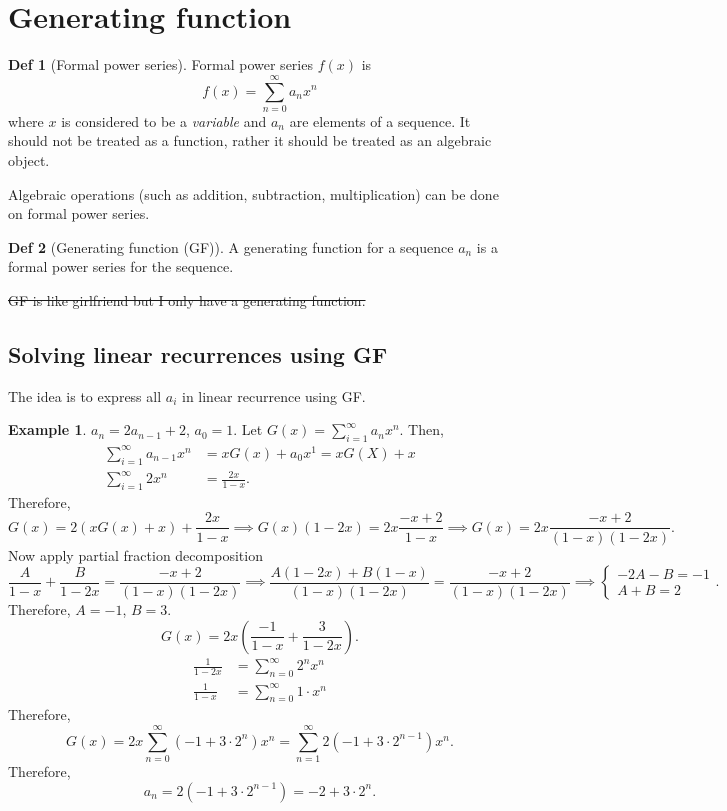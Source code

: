 \documentclass[a4paper]{article}
\theoremstyle{definition}
\newtheorem{definition}{Def}
\newtheorem{example}{Example}[section]
\begin{document}
\section{Generating function}

\begin{definition}[Formal power series]
  Formal power series \(f(x)\) is
  \[
    f(x) = \sum_{n = 0}^\infty a_n x^n
  \]
  where \(x\) is considered to be a \textit{variable}
  and \(a_n\) are elements of a sequence.
  It should not be treated as a function, rather
  it should be treated as an algebraic object.
\end{definition}
Algebraic operations (such as addition, subtraction, multiplication)
can be done on formal power series.
\begin{definition}[Generating function (GF)]
  A generating function for a sequence \(a_n\) is a
  formal power series for the sequence.
\end{definition}
\sout{GF is like girlfriend but I only have a generating function.}

\subsection{Solving linear recurrences using GF}

The idea is to express all \(a_i\) in linear recurrence using GF.
\begin{example}
  \(a_n = 2 a_{n - 1} + 2\),  \(a_0 = 1\).
  Let  \(G(x) = \sum_{i = 1}^\infty a_n x^n\).
  Then,
  \begin{align*}
    \sum_{i = 1}^\infty a_{n - 1} x^n &= x G(x) + a_0 x^1 = x G(X) + x \\
    \sum_{i = 1}^\infty 2 x^n &= \frac{2x}{1 - x}.
  \end{align*}
  Therefore,
  \[
    G(x) = 2 (x G(x) + x) + \frac{2x}{1 - x}
    \implies
    G(x)(1 - 2x) = 2x\frac{-x + 2}{1 - x}
    \implies
    G(x) = 2x \frac{-x + 2}{(1-x)(1-2x)}
  .\]
  Now apply partial fraction decomposition
  \[
  \frac{A}{1 - x} + \frac{B}{1 - 2x} = \frac{-x + 2}{(1-x)(1-2x)}
  \implies
  \frac{A(1 - 2x) + B(1-x)}{(1-x)(1-2x)} = \frac{-x + 2}{(1-x)(1-2x)}
  \implies
  \begin{cases}
    -2A - B = -1 \\
    A + B = 2
  \end{cases}
  .\]
  Therefore, \(A = -1\), \(B = 3\).
  \[
    G(x) = 2x \left( \frac{-1}{1 - x} + \frac{3}{1 - 2x} \right)
  .\]
  \begin{align*}
    \frac{1}{1 - 2x} &= \sum_{n = 0}^\infty 2^n x^n \\
    \frac{1}{1 - x} &= \sum_{n = 0}^\infty 1 \cdot x^n
  \end{align*}
  Therefore,
  \[
    G(x) = 2x \sum_{n = 0}^\infty (-1 + 3 \cdot 2^n) x^n
    = \sum_{n = 1}^\infty 2 (-1 + 3 \cdot 2^{n - 1}) x^n
  .\]
  Therefore,
  \[
    a_n = 2(-1 + 3 \cdot 2^{n - 1}) = -2 + 3 \cdot 2^n
  .\]
\end{example}
\end{document}
